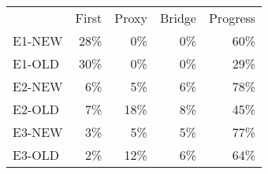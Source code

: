 \begin{tabular}{l r r r r}
& First & Proxy & Bridge & Progress \\
\noalign{\hrule}
E1-NEW & 28\% & 0\% & 0\% & 60\% \\
E1-OLD & 30\% & 0\% & 0\% & 29\% \\
E2-NEW & 6\% & 5\% & 6\% & 78\% \\
E2-OLD & 7\% & 18\% & 8\% & 45\% \\
E3-NEW & 3\% & 5\% & 5\% & 77\% \\
E3-OLD & 2\% & 12\% & 6\% & 64\% \\
\end{tabular}
